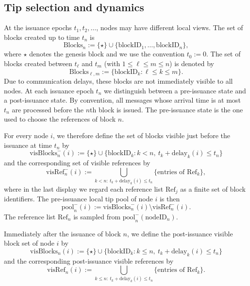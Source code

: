 \documentclass[a4paper,12pt,oneside,reqno]{amsart}
\newcommand{\blockID}{\mathrm{blockID}}
\newcommand{\nodeID}{\mathrm{nodeID}}
\newcommand{\blockDelay}{\mathrm{delay}}
\newcommand{\blocks}{\mathrm{Blocks}}
\newcommand{\visibleBlocks}{\mathrm{visBlocks}}
\newcommand{\visibleRef}{\mathrm{visRef}}
\newcommand{\1}{{\mathbf 1}}
\newcommand{\pool}{\mathrm{pool}}
\newcommand{\refBlock}{\mathrm{Ref}}
\begin{document}
\subsection{Tip selection and dynamics}
At the issuance epochs $t_1,t_2,\ldots$, nodes may have different local views. The set of blocks created up to time $t_n$ is
\begin{equation}
    \blocks_n := \{\star\}\cup\{\blockID_1,\ldots,\blockID_n\},
\end{equation}
where $\star$ denotes the genesis block and we use the convention $t_0:=0$.
The set of blocks created between $t_\ell$ and $t_m$ (with $1\le\ell\le m\le n$) is denoted by 
\begin{equation}
    \blocks_{\ell,m} := \{\blockID_k: \ell\le k\le m\}.
\end{equation}
Due to communication delays, these blocks are not immediately visible to all nodes. At each issuance epoch $t_n$ we distinguish between a pre-issuance state and a post-issuance state. By convention, all messages whose arrival time is at most $t_n$ are processed before the $n$th block is issued. The pre-issuance state is the one used to choose the references of block $n$.

For every node $i$, we therefore define the set of blocks visible just before the issuance at time $t_n$ by
\begin{equation}
    \visibleBlocks_n^{-}(i) := \{\star\}\cup\{\blockID_k: k<n,\ t_k + \blockDelay_k(i) \le t_n\}
\end{equation}
and the corresponding set of visible references by
\begin{equation}
    \visibleRef_n^{-}(i) := \bigcup_{k<n:\ t_k + \blockDelay_k(i) \le t_n} \{\text{entries of }\refBlock_k\},
\end{equation}
where in the last display we regard each reference list $\refBlock_j$ as a finite set of block identifiers. The pre-issuance local tip pool of node $i$ is then
\begin{equation}
    \pool_n^{-}(i) := \visibleBlocks_n^{-}(i) \setminus \visibleRef_n^{-}(i).
\end{equation}
The reference list $\refBlock_n$ is sampled from $\pool_n^{-}(\nodeID_n)$.

Immediately after the issuance of block $n$, we define the post-issuance visible block set of node $i$ by
\begin{equation}
    \visibleBlocks_n(i) := \{\star\}\cup\{\blockID_k: k\le n,\ t_k + \blockDelay_k(i) \le t_n\}
\end{equation}
and the corresponding post-issuance visible references by 
\begin{equation}
    \visibleRef_n(i) := \bigcup_{k\le n:\ t_k + \blockDelay_k(i) \le t_n} \{\text{entries of }\refBlock_k\}.
\end{equation}
\end{document}
